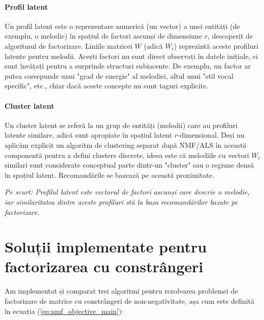 \documentclass[12pt,a4paper]{article}
\begin{document}
	\paragraph{Profil latent}
	Un profil latent este o reprezentare numerică (un vector) a unei entități (de exemplu, o melodie) în spațiul de factori ascunși de dimensiune $r$, descoperit de algoritmul de factorizare. Liniile matricei $W$ (adică $W_i$) reprezintă aceste profiluri latente pentru melodii. Acești factori nu sunt direct observați în datele inițiale, ci sunt învățați pentru a surprinde structuri subiacente. De exemplu, un factor ar putea corespunde unui "grad de energie" al melodiei, altul unui "stil vocal specific", etc., chiar dacă aceste concepte nu sunt taguri explicite.

	\paragraph{Cluster latent}
	Un cluster latent se referă la un grup de entități (melodii) care au profiluri latente similare, adică sunt apropiate în spațiul latent $r$-dimensional. Deși nu aplicăm explicit un algoritm de clustering separat după NMF/ALS în această componentă pentru a defini clustere discrete, ideea este că melodiile cu vectori $W_i$ similari sunt considerate conceptual parte dintr-un "cluster" sau o regiune densă în spațiul latent. Recomandările se bazează pe această proximitate.

	\vspace{0.5em}
	\textit{Pe scurt: Profilul latent este vectorul de factori ascunși care descrie o melodie, iar similaritatea dintre aceste profiluri stă la baza recomandărilor bazate pe factorizare.}
	\vspace{1em}

	\section{Soluții implementate pentru factorizarea cu constrângeri}

	Am implementat și comparat trei algoritmi pentru rezolvarea problemei de factorizare de matrice cu constrângeri de non-negativitate, așa cum este definită în ecuația (\ref{eq:nmf_objective_main}):
\end{document}
